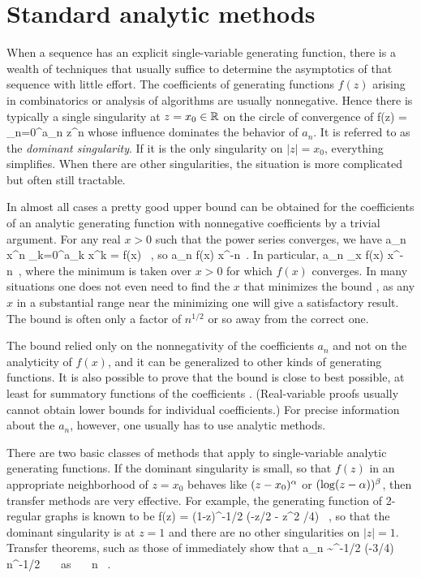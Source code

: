 \section{Standard analytic methods}
\hsp
When a sequence has an explicit single-variable generating
function, there is a wealth of techniques that usually suffice to determine
the asymptotics of that sequence with little effort.
The coefficients of generating functions $f(z)$ arising in
combinatorics or analysis of algorithms are usually nonnegative.
Hence there is typically a single singularity at $z=x_0 \in {\Bbb R}$
on the circle of convergence of 
f(z) = \sum_{n=0}^\In a_n z^n
\eeq
whose influence dominates the behavior of $a_n$.
It is referred to as the {\em dominant singularity}.
If it is the only singularity on $|z| = x_0$, everything simplifies.
When there are other singularities, the situation is more complicated but
often still tractable.

In almost all cases a pretty good upper bound can be obtained
for the coefficients of an analytic generating function with nonnegative coefficients by a trivial argument.
For any real $x > 0$ such that the power series 
converges, we have
a_n x^n \le \sum_{k=0}^\In a_k x^k = f(x) ~,
\eeq
so
a_n \le f(x) x^{-n}~.
\eeq
In particular,
a_n \le \min_x f(x) x^{-n}~,
\eeq
where the minimum is taken over $x > 0$ for which $f(x)$ converges.
In many situations one does not even need to find the $x$ that
minimizes the bound , as any $x$ in a substantial range near the
minimizing one will give a satisfactory result.
The bound  is often only a factor of $n^{1/2}$ or so
away from the correct one.

The bound  relied only on the nonnegativity of the coefficients $a_n$ and not on the analyticity of $f(x)$, and it can be generalized
to other kinds of generating functions.
It is also possible to prove that the bound  is close to
best possible, at least for summatory functions of the coefficients
\cite{AMO4}.
(Real-variable proofs usually cannot obtain lower bounds for
individual coefficients.)
For precise information about the $a_n$, however, one usually has to use analytic methods.

There are two basic classes of methods that apply to single-variable analytic generating functions.
If the dominant singularity is small, so that $f(z)$ in an appropriate
neighborhood of $z=x_0$
behaves like $(z-x_0)^\alpha$ or $( \log (z- \alpha ))^\beta$, then
transfer methods are very effective.
For example, the generating function of 2-regular graphs is known \cite{Comtet74} to be
f(z) = (1-z)^{-1/2} \exp (-z/2 - z^2 /4) ~,
\eeq
so that the dominant singularity is at $z=1$ and there are no other singularities on $|z| =1$.
Transfer theorems, such as those of \cite{FAMO3} immediately show that
a_n \sim \pi^{-1/2} \exp (-3/4) n^{-1/2} ~~~\mbox{as}~~~
n \to \In ~.
\eeq

